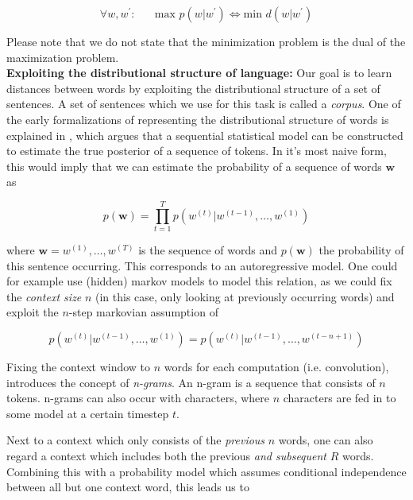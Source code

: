 \documentclass[a4paper,12pt,oneside,openright]{report}
\begin{document}
\begin{equation}
\forall w, w^{\prime} : \hspace{20pt} \text{max } p \left(w | w^{\prime}\right) \iff \text{min } d(w | w^{\prime})
\end{equation}

Please note that we do not state that the minimization problem is the dual of the maximization problem. \\

\textbf{Exploiting the distributional structure of language:} Our goal is to learn distances between words by exploiting the distributional structure of a set of sentences.
A set of sentences which we use for this task is called a \textit{corpus}. 
One of the early formalizations of representing the distributional structure of words is explained in \cite{bengio03}, which argues that a sequential statistical model can be constructed to estimate the true posterior of a sequence of tokens.  
In it's most naive form, this would imply that we can estimate the probability of a sequence of words $\mathbf{w}$ as

\begin{equation}
p(\mathbf{w}) = \prod_{t=1}^T p\left( w^{(t)} | w^{(t -1)}, \ldots, w^{(1)} \right)
\label{eq:naive_sequential_probability}
\end{equation}

where $\mathbf{w} = w^{(1)}, \dots, w^{(T)} $ is the sequence of words and $p(\mathbf{w})$ the probability of this sentence occurring.
This corresponds to an autoregressive model.
One could for example use (hidden) markov models to model this relation, as we could fix the \textit{context size} $n$ (in this case, only looking at previously occurring words) and exploit the $n$-step markovian assumption of

\begin{equation}
p\left( w^{(t)} | w^{(t -1)}, \ldots, w^{(1)} \right) = p\left( w^{(t)} | w^{(t -1)}, \ldots, w^{(t - n + 1)} \right)
\end{equation}\label{eq:naive_sequential_probability_markovian}

Fixing the context window to $n$ words for each computation (i.e. convolution), introduces the concept of \textit{n-grams}. 
An n-gram is a sequence that consists of $n$ tokens.
n-grams can also occur with characters, where $n$ characters are fed in to some model at a certain timestep $t$.

Next to a context which only consists of the \textit{previous} $n$ words, one can also regard a context which includes both the previous \textit{and subsequent} $R$ words. 
Combining this with a probability model which assumes conditional independence between all but one context word, this leads us to
\end{document}
